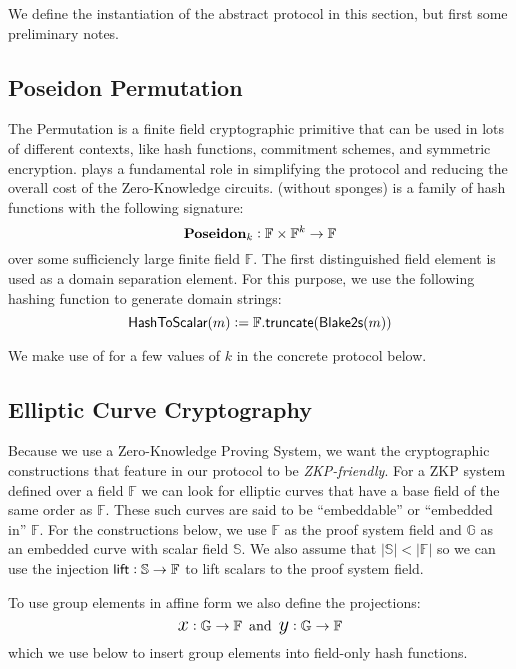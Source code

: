 
We define the instantiation of the abstract protocol in this section, but first some preliminary notes.

\subsection{Poseidon Permutation}

The \Poseidon{} Permutation \cite{KRRS21USENIX} is a finite field cryptographic primitive that can be used in lots of different contexts, like hash functions, commitment schemes, and symmetric encryption. \Poseidon{} plays a fundamental role in simplifying the \Transfer{} protocol and reducing the overall cost of the Zero-Knowledge circuits. \Poseidon{} (without sponges) is a family of hash functions with the following signature:
\[{\textbf{Poseidon}}_k : \mathbb{F} \times \mathbb{F}^k \to \mathbb{F}\]
over some sufficiencly large finite field $\mathbb{F}$. The first distinguished field element is used as a domain separation element. For this purpose, we use the following hashing function to generate domain strings:
\[{\textsf{HashToScalar}}(m) := \mathbb{F}.{\textsf{truncate}}(\textsf{Blake2s}(m))\]

We make use of \Poseidon{} for a few values of $k$ in the concrete protocol below.

\subsection{Elliptic Curve Cryptography}

Because we use a Zero-Knowledge Proving System, we want the cryptographic constructions that feature in our protocol to be \emph{ZKP-friendly}. For a ZKP system defined over a field $\mathbb{F}$ we can look for elliptic curves that have a base field of the same order as $\mathbb{F}$. These such curves are said to be ``embeddable'' or ``embedded in'' $\mathbb{F}$. For the constructions below, we use $\mathbb{F}$ as the proof system field and $\mathbb{G}$ as an embedded curve with scalar field $\mathbb{S}$. We also assume that $\left|\mathbb{S}\right| < \left|\mathbb{F}\right|$ so we can use the injection ${\textsf{lift}} : \mathbb{S} \to \mathbb{F}$ to lift scalars to the proof system field. 

To use group elements in affine form we also define the projections:
\[{\text{\Large $x$}} : \mathbb{G} \to \mathbb{F} \,\,\,\text{and}\,\,\, {\text{\Large $y$}} : \mathbb{G} \to \mathbb{F}\]
which we use below to insert group elements into field-only hash functions.


